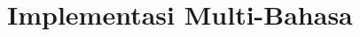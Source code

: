 \documentclass[../buku_kriptografi.tex]{subfiles}
\begin{document}
\ifdefined\InMainDocument\else\setcounter{chapter}{13}\fi

\chapter{Implementasi Multi-Bahasa}








\ifdefined\InMainDocument\else


\fi
\end{document}
